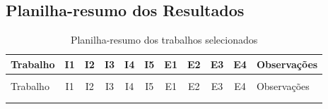 \documentclass[12pt,a4paper]{article}
\begin{document}
\clearpage
\begin{landscape}

\section{Planilha-resumo dos Resultados}

\begingroup
\scriptsize
\setlength{\tabcolsep}{3pt}
\renewcommand{\arraystretch}{1.1}

\begin{xltabular}{\linewidth}{
    >{\raggedright\arraybackslash}X
    *{9}{c}
    >{\raggedright\arraybackslash}X
}
    \caption{Planilha-resumo dos trabalhos selecionados}
    \label{tab:comparativo1} \\

    \toprule
    Trabalho & I1 & I2 & I3 & I4 & I5 &
    E1 & E2 & E3 & E4 & Observações \\
    \midrule
    \endfirsthead

     \\

    \toprule
    Trabalho & I1 & I2 & I3 & I4 & I5 &
    E1 & E2 & E3 & E4 & Observações \\
    \midrule
    \endhead

    \midrule
     \\
    \endfoot

    \bottomrule
    \endlastfoot



\end{xltabular}
\end{landscape}
\end{document}
